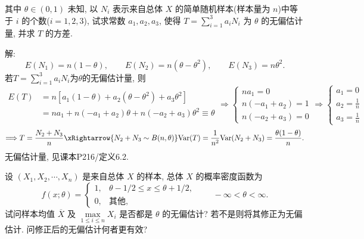 \documentclass[standard]{ExBook}
\renewenvironment{shaded}{%
  \def\FrameCommand{\fboxsep=\FrameSep \colorbox{shadecolor}}%
  \MakeFramed{\advance\hsize-\width \FrameRestore}%
}{%
  \endMakeFramed
}
\begin{document}
\begin{qitems}
\begin{bbox}
\begin{shaded}
其中 \( \theta \in (0, 1) \) 未知, 以 \( N_i \) 表示来自总体 \( X \) 的简单随机样本(样本量为 \( n \))中等于 \( i \) 的个数(\( i = 1, 2, 3 \)), 试求常数 \( a_1, a_2, a_3 \), 使得 \( T = \displaystyle\sum\limits_{i=1}^{3} a_i N_i \) 为 \( \theta \) 的无偏估计量, 并求 \( T \) 的方差.
    \end{shaded}
    \end{bbox}

\vspace{\dimexpr2.5cm-5em\relax}

解:
$$
E(N_1)=n(1-\theta),\qquad E(N_2)=n(\theta-\theta^2),\qquad E(N_3)=n\theta^2.
$$
若$T=\displaystyle\sum\limits_{i=1}^{3}a_iN_i$为$\theta$的无偏估计量, 则
$$
\begin{aligned}
E(T)
&=n\left[a_1(1-\theta)+a_2(\theta-\theta^2)+a_3\theta^2\right]\\
&=na_1+n(-a_1+a_2)\theta+n(-a_2+a_3)\theta^2
\equiv \theta
\end{aligned}
\Longrightarrow
\left\{
\begin{array}{l}
na_1=0\\
n(-a_1+a_2)=1\\
n(-a_2+a_3)=0
\end{array}
\right.
\Longrightarrow
\left\{
\begin{array}{l}
a_1=0\\
a_2=\displaystyle\frac{1}{n}\\
a_3=\displaystyle\frac{1}{n}
\end{array}
\right.
$$
$$
\Longrightarrow
T=\frac{N_2+N_3}{n}
\xRightarrow{N_2+N_3\sim B(n,\theta)}
\mathrm{Var}(T)=\frac{1}{n^2}\mathrm{Var}(N_2+N_3)
=\frac{\theta(1-\theta)}{n}.
$$
\textcolor{themeColor}{\selectfont {} 无偏估计量, 见课本P216/定义6.2.}

\vspace{2.5cm-5em}

    \begin{bbox}
    \begin{shaded}
        \qitem
设 \((X_1, X_2, \cdots, X_n)\) 是来自总体 \(X\) 的样本, 总体 \(X\) 的概率密度函数为  
\[f(x; \theta) = 
\begin{cases} 
1, & \theta - 1/2 \leq x \leq \theta + 1/2, \\ 
0, & \text{其他}, 
\end{cases}
\qquad
- \infty < \theta < \infty.\]
试问样本均值 \(\overline{X}\) 及 \(\max\limits_{1 \leq i \leq n} X_i\) 是否都是 \(\theta\) 的无偏估计? 若不是则将其修正为无偏估计. 问修正后的无偏估计何者更有效?
    \end{shaded}
    \end{bbox}


\end{qitems}
\end{document}
